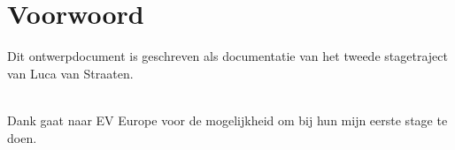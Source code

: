 \chapter*{Voorwoord}

Dit ontwerpdocument is geschreven als documentatie van het tweede stagetraject
van Luca van Straaten.\\\

Dank gaat naar EV Europe voor de mogelijkheid om bij hun mijn eerste stage te doen.\\\


